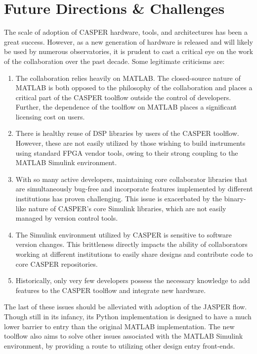 \documentclass{ws-jai}
\begin{document}
\section{Future Directions \& Challenges} \label{sec:Future}
The scale of adoption of CASPER hardware, tools, and architectures has been a great success. However, as a new generation of hardware is released and will likely be used by numerous observatories, it is prudent to cast a critical eye on the work of the collaboration over the past decade. Some legitimate criticisms are:
\begin{enumerate}
    \item The collaboration relies heavily on MATLAB. The closed-source nature of MATLAB is both opposed to the philosophy of the collaboration and places a critical part of the CASPER toolflow outside the control of developers. Further, the dependence of the toolflow on MATLAB places a significant licensing cost on users.

    \item There is healthy reuse of DSP libraries by users of the CASPER toolflow. However, these are not easily utilized by those wishing to build instruments using standard FPGA vendor tools, owing to their strong coupling to the MATLAB Simulink environment.

    \item With so many active developers, maintaining core collaborator libraries that are simultaneously bug-free and incorporate features implemented by different institutions has proven challenging. This issue is exacerbated by the binary-like nature of CASPER's core Simulink libraries, which are not easily managed by version control tools.

    \item The Simulink environment utilized by CASPER is sensitive to software version changes. This brittleness directly impacts the ability of collaborators working at different institutions to easily share designs and contribute code to core CASPER repositories.

    \item Historically, only very few developers possess the necessary knowledge to add features to the CASPER toolflow and integrate new hardware.
\end{enumerate}

The last of these issues should be alleviated with adoption of the JASPER flow. Though still in its infancy, its Python implementation is designed to have a much lower barrier to entry than the original MATLAB implementation. The new toolflow also aims to solve other issues associated with the MATLAB Simulink environment, by providing a route to utilizing other design entry front-ends.
\end{document}
